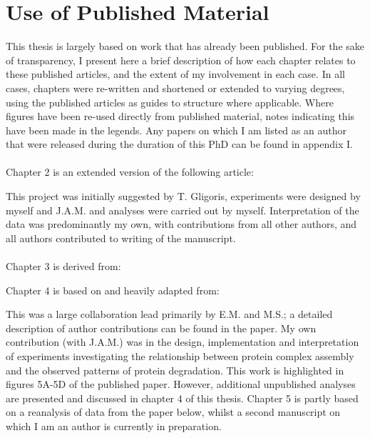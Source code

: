 \documentclass[a4paper,11pt,twoside,openright]{scrbook}
\begin{document}
\chapter*{Use of Published Material}
This thesis is largely based on work that has already been published. For the sake of transparency, I present here a brief description of how each chapter relates to these published articles, and the extent of my involvement in each case. In all cases, chapters were re-written and shortened or extended to varying degrees, using the published articles as guides to structure where applicable. Where figures have been re-used directly from published material, notes indicating this have been made in the legends. Any papers on which I am listed as an author that were released during the duration of this PhD can be found in appendix I.
\\~\\
Chapter 2 is an extended version of the following article:
\begin{quote}
\end{quote}
This project was initially suggested by T. Gligoris, experiments were designed by myself and J.A.M. and analyses were carried out by myself. Interpretation of the data was predominantly my own, with contributions from all other authors, and all authors contributed to writing of the manuscript.
\\~\\
Chapter 3 is derived from:
\begin{quote}
\end{quote}
Chapter 4 is based on and heavily adapted from:
\begin{quote}
\end{quote}
This was a large collaboration lead primarily by E.M. and M.S.; a detailed description of author contributions can be found in the paper. My own contribution (with J.A.M.) was in the design, implementation and interpretation of experiments investigating the relationship between protein complex assembly and the observed patterns of protein degradation. This work is highlighted in figures 5A-5D of the published paper. However, additional unpublished analyses are presented and discussed in chapter 4 of this thesis.
Chapter 5 is partly based on a reanalysis of data from the paper below, whilst a second manuscript on which I am an author is currently in preparation.
\end{document}
